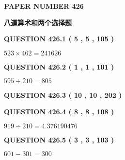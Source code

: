 \documentclass{ctexart}
\begin{document}
   
   
   
 {\textbf{ \Large{ PAPER NUMBER  426  }}}
   
   
\vspace{0.2in}
   
   
   
   
   
   
 \vspace{0.2in}
{\LARGE {\textbf{ 八道算术和两个选择题}}}
   
   
  
\vspace{0.2in}
  
{\textbf{\Large{QUESTION
426.1 
 ( 5 , 5 , 105 )
}}}
  
  
 
 

$ %
523 \times  %
462=   %
241626$
 
 
  
\vspace{0.2in}
  
{\textbf{\Large{QUESTION
426.2 
 ( 1 , 1 , 101 )
}}}
  
  
 
 

$ %
595 +  %
210=   %
805$
 
 
  
\vspace{0.2in}
  
{\textbf{\Large{QUESTION
426.3 
 ( 10 , 10 , 202 )
}}}
  
  
  
\vspace{0.2in}
  
{\textbf{\Large{QUESTION
426.4 
 ( 8 , 8 , 108 )
}}}
  
  
 
 

$ %
919 \div  %
210=   %
4.376190476$
 
 
  
\vspace{0.2in}
  
{\textbf{\Large{QUESTION
426.5 
 ( 3 , 3 , 103 )
}}}
  
  
 
 

$ %
601 -  %
301=   %
300$
 
 
  
\vspace{0.2in}
  
\end{document}

